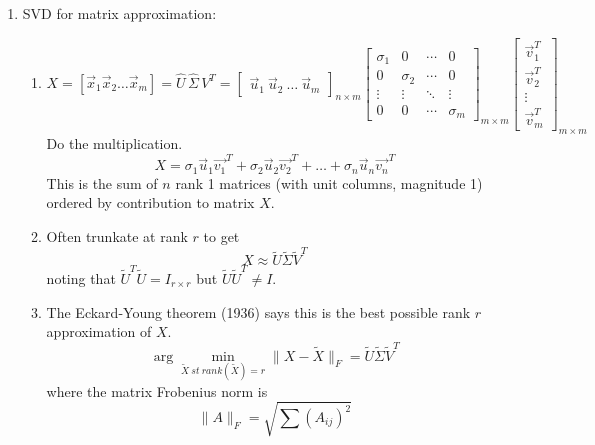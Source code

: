 \documentclass{article}
\begin{document}
\begin{enumerate}
\item SVD for matrix approximation:
\begin{enumerate}
\item 
\[
X = \left[\vec{x}_1 \vec{x}_2 \dots \vec{x}_m \right]
= \widehat{U}\,\widehat{\Sigma}\,V^{T}
=
\begin{bmatrix}
\vec{u}_1 ~ \vec{u}_2 ~ \dots ~ \vec{u}_m
\end{bmatrix}_{n \times m}
\begin{bmatrix}
\sigma_1 & 0 & \cdots & 0 \\
0 & \sigma_2 & \cdots & 0 \\
\vdots & \vdots & \ddots & \vdots \\
0 & 0 & \cdots & \sigma_m 
\end{bmatrix} _{m \times m}
\begin{bmatrix}
\vec{v}_1^T \\
\vec{v}_2^T \\
\vdots \\
\vec{v}_m^T
\end{bmatrix}_{m \times m}
\]
Do the multiplication.
\[
X = \sigma_1 \vec{u}_1 \vec{v_1}^T +  \sigma_2 \vec{u}_2 \vec{v_2}^T + \dots + \sigma_n \vec{u}_n \vec{v_n}^T
\]
This is the sum of $n$ rank 1 matrices (with unit columns, magnitude 1) ordered by contribution to matrix $X$.

\item Often trunkate at rank $r$ to get
\[
X \approx \tilde{U} \tilde{\Sigma} \tilde{V}^T
\]
noting that $\tilde{U}^T \tilde{U} = I_{r \times r}$ but $\tilde{U} \tilde{U}^T \neq I$.

\item The Eckard-Young theorem (1936) says this is the best possible rank $r$ approximation of $X$. 
\[
\arg\min_{\tilde{X} ~st~ rank(\tilde{X})=r} \| X - \tilde{X} \|_F =  \tilde{U} \tilde{\Sigma} \tilde{V}^T
\]
where the matrix Frobenius norm is
\[
\|A \|_F = \sqrt{\sum (A_{ij})^2}
\]
\end{enumerate}


\end{enumerate}
\end{document}
